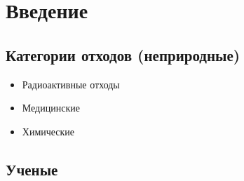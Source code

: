 \chapter{Введение}

\section{Категории отходов (неприродные)}

\begin{itemize}
    \item Радиоактивные отходы
    \item Медицинские
    \item Химические
\end{itemize}

\section{Ученые}

